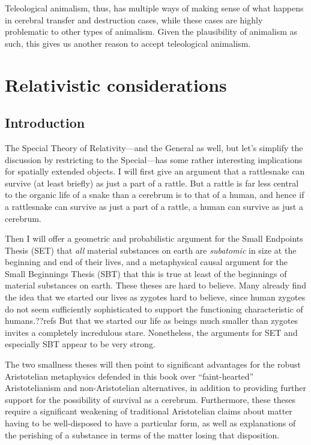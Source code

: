 Teleological animalism, thus, has multiple ways of making sense of what happens in cerebral transfer and destruction cases, while these cases
are highly problematic to other types of animalism. Given the plausibility of animalism as such, this gives us another reason to accept
teleological animalism.

\section{Relativistic considerations}
\subsection{Introduction}
The Special Theory of Relativity---and the General as well, but let's simplify the discussion by restricting to 
the Special---has some rather interesting implications for spatially extended objects. I will first give an argument
that a rattlesnake can survive (at least briefly) as just a part of a rattle. But a rattle is far less central to the organic
life of a snake than a cerebrum is to that of a human, and hence if a rattlesnake can survive as just a part of a rattle, a human
can survive as just a cerebrum. 

Then I will offer a geometric and probabilistic argument for the Small Endpoints Thesis 
(SET) that \textit{all} material substances on earth are \textit{subatomic} in size at the beginning and end of their lives, 
and a metaphysical causal argument for the Small Beginnings Thesis (SBT) that this is true at least of the 
beginnings of material substances on earth. These theses are hard to believe. Many already find the idea that we started 
our lives as zygotes hard to believe, since human zygotes do not seem sufficiently sophisticated to support the 
functioning characteristic of humans.??refs But that we started our life as beings much smaller than zygotes invites 
a completely incredulous stare. Nonetheless, the arguments for SET and especially SBT appear to be very strong.

The two smallness theses will then point to significant advantages for the robust Aristotelian metaphysics defended 
in this book over ``faint-hearted'' Aristotelianism and non-Aristotelian alternatives, in addition to providing
further support for the possibility of survival as a cerebrum. Furthermore, these theses require a significant 
weakening of traditional Aristotelian claims about matter having to be well-disposed to have a particular form, 
as well as explanations of the perishing of a substance in terms of the matter losing that disposition. 

